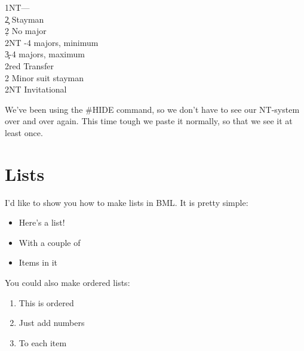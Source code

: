 \documentclass[a4paper]{article}
\begin{document}
\begin{bidtable}
1NT---\\
2\c \> Stayman\+\\
2\d \> No major\\
2NT -4 majors, minimum\\
3\c {}-4 majors, maximum\-\\
2red \> Transfer\\
2\s \> Minor suit stayman\\
2NT \> Invitational
\end{bidtable}

We've been using the \#HIDE command, so we don't have to see our
NT-system over and over again. This time tough we paste it
normally, so that we see it at least once.

\section{Lists}

I'd like to show you how to make lists in BML. It is pretty
simple:

\begin{itemize}
\item Here's a list!

\item With a couple of

\item Items in it

\end{itemize}

You could also make ordered lists:

\begin{enumerate}
\item This is ordered

\item Just add numbers

\item To each item

\end{enumerate}
\end{document}
